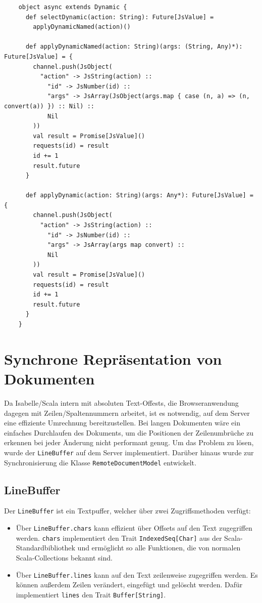 \begin{lstlisting}
    object async extends Dynamic {
      def selectDynamic(action: String): Future[JsValue] =
        applyDynamicNamed(action)()

      def applyDynamicNamed(action: String)(args: (String, Any)*): Future[JsValue] = {
        channel.push(JsObject(
          "action" -> JsString(action) ::
            "id" -> JsNumber(id) ::
            "args" -> JsArray(JsObject(args.map { case (n, a) => (n, convert(a)) }) :: Nil) ::
            Nil
        ))
        val result = Promise[JsValue]()
        requests(id) = result
        id += 1
        result.future
      }

      def applyDynamic(action: String)(args: Any*): Future[JsValue] = {
        channel.push(JsObject(
          "action" -> JsString(action) ::
            "id" -> JsNumber(id) ::
            "args" -> JsArray(args map convert) ::
            Nil
        ))
        val result = Promise[JsValue]()
        requests(id) = result
        id += 1
        result.future
      }
    }
\end{lstlisting}

\clearpage

\section{Synchrone Repräsentation von Dokumenten}
\label{sec:linebuffer}

Da Isabelle/Scala intern mit absoluten Text-Offests, die Browseranwendung dagegen mit
Zeilen/Spaltennummern arbeitet, ist es notwendig, auf dem Server eine effiziente Umrechnung
bereitzustellen. Bei langen Dokumenten wäre ein einfaches Durchlaufen des Dokuments, um die
Positionen der Zeilenumbrüche zu erkennen bei jeder Änderung nicht performant genug. Um das Problem
zu lösen, wurde der \texttt{LineBuffer} auf dem Server implementiert. Darüber hinaus wurde zur
Synchronisierung die Klasse \texttt{RemoteDocumentModel} entwickelt.

\subsection{LineBuffer}

Der \texttt{LineBuffer} ist ein Textpuffer, welcher über zwei Zugriffsmethoden verfügt:

\begin{itemize}
  \item Über \texttt{LineBuffer.chars} kann effizient über Offsets auf den Text zugegriffen werden. 
  \texttt{chars} implementiert den Trait \texttt{IndexedSeq[Char]} aus der Scala-Standardbibliothek
  und ermöglicht so alle Funktionen, die von normalen Scala-Collections bekannt sind.
  \item Über \texttt{LineBuffer.lines} kann auf den Text zeilenweise zugegriffen werden. Es können 
  außerdem Zeilen verändert, eingefügt und gelöscht werden. Dafür implementiert \texttt{lines} den 
  Trait \texttt{Buffer[String]}.
\end{itemize}

